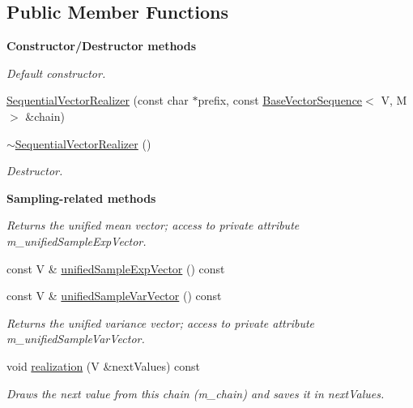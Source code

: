 \subsection*{Public Member Functions}
\begin{Indent}{\bf Constructor/\-Destructor methods}\par
{\em Default constructor. }\begin{DoxyCompactItemize}
\item 
\hyperlink{class_q_u_e_s_o_1_1_sequential_vector_realizer_a8a39a19e20c9f2e2521750b2c12f0ede}{Sequential\-Vector\-Realizer} (const char $\ast$prefix, const \hyperlink{class_q_u_e_s_o_1_1_base_vector_sequence}{Base\-Vector\-Sequence}$<$ V, M $>$ \&chain)
\item 
\hyperlink{class_q_u_e_s_o_1_1_sequential_vector_realizer_a8e982c9719fb7998601d79d76fea9d4a}{$\sim$\-Sequential\-Vector\-Realizer} ()
\begin{DoxyCompactList}\small\item\em Destructor. \end{DoxyCompactList}\end{DoxyCompactItemize}
\end{Indent}
\begin{Indent}{\bf Sampling-\/related methods}\par
{\em Returns the unified mean vector; access to private attribute m\-\_\-unified\-Sample\-Exp\-Vector. }\begin{DoxyCompactItemize}
\item 
const V \& \hyperlink{class_q_u_e_s_o_1_1_sequential_vector_realizer_ac7c24dd2a5663d245ba1e37556a68bce}{unified\-Sample\-Exp\-Vector} () const 
\item 
const V \& \hyperlink{class_q_u_e_s_o_1_1_sequential_vector_realizer_a79981fe171d8596d55172f5fa600ee29}{unified\-Sample\-Var\-Vector} () const 
\begin{DoxyCompactList}\small\item\em Returns the unified variance vector; access to private attribute m\-\_\-unified\-Sample\-Var\-Vector. \end{DoxyCompactList}\item 
void \hyperlink{class_q_u_e_s_o_1_1_sequential_vector_realizer_a67050d12ad38147f9f0743a0e53011b2}{realization} (V \&next\-Values) const 
\begin{DoxyCompactList}\small\item\em Draws the next value from this chain ({\ttfamily m\-\_\-chain}) and saves it in {\ttfamily next\-Values}. \end{DoxyCompactList}\end{DoxyCompactItemize}
\end{Indent}
